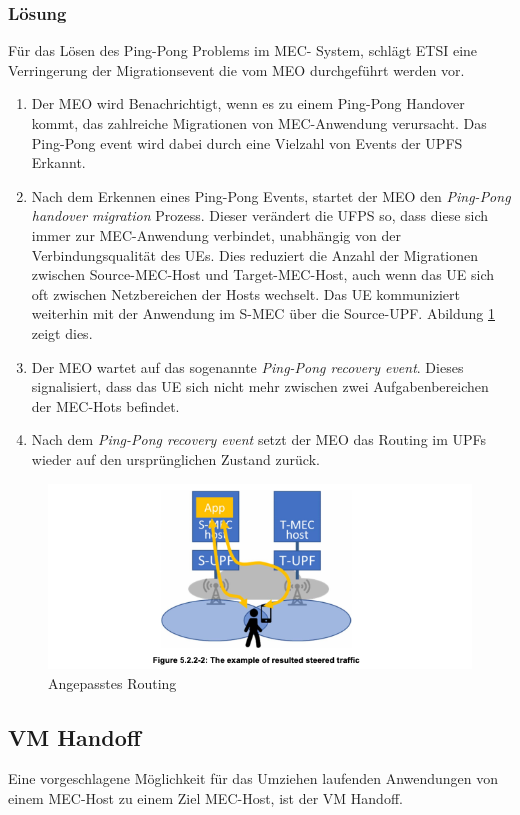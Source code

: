 \documentclass[runningheads]{llncs}
\numberwithin{figure}{section}
\begin{document}
\subsubsection{Lösung}
Für das Lösen des Ping-Pong Problems im MEC- System, schlägt ETSI eine Verringerung der Migrationsevent die vom MEO durchgeführt werden vor.
\begin{enumerate}
  \item Der MEO wird Benachrichtigt, wenn es zu einem Ping-Pong Handover kommt, das zahlreiche Migrationen von MEC-Anwendung verursacht. Das
  Ping-Pong event wird dabei durch eine Vielzahl von Events der UPFS Erkannt.
  \item Nach dem Erkennen eines Ping-Pong Events, startet der MEO den \textit{Ping-Pong handover migration} Prozess. Dieser verändert die UFPS 
  so, dass diese sich immer zur MEC-Anwendung verbindet, unabhängig von der Verbindungsqualität des UEs. Dies reduziert die Anzahl der Migrationen
  zwischen Source-MEC-Host und Target-MEC-Host, auch wenn das UE sich oft zwischen Netzbereichen der Hosts wechselt. Das UE kommuniziert weiterhin
  mit der Anwendung im S-MEC über die Source-UPF. Abildung \ref{fig:pingpongrouting} zeigt dies.
  \item Der MEO wartet auf das sogenannte \textit{Ping-Pong recovery event}. Dieses signalisiert, dass das UE sich nicht mehr zwischen zwei
  Aufgabenbereichen der MEC-Hots befindet.
  \item  Nach dem \textit{Ping-Pong recovery event} setzt der MEO das Routing im UPFs wieder auf den ursprünglichen Zustand zurück.
\end{enumerate}
\begin{figure}
  \includegraphics[width=\linewidth]{images/pingpongrouting.png}
  \caption{Angepasstes Routing}
  \label{fig:pingpongrouting}
\end{figure}

\subsection{VM Handoff}
Eine vorgeschlagene Möglichkeit \cite{etsiETSIGSMEC} für das Umziehen laufenden Anwendungen von einem MEC-Host zu einem Ziel MEC-Host, 
ist der VM Handoff. \cite{Ha2015AdaptiveVH}
\newpage
\end{document}
